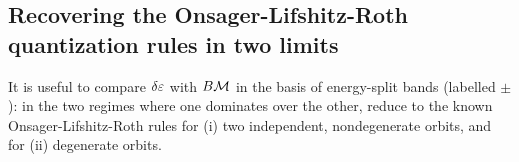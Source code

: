 \documentclass[aps, showpacs, twocolumn, notitlepage, superscriptaddress]{revtex4-1}
\begin{document}





\subsection{Recovering the Onsager-Lifshitz-Roth quantization rules in two limits}\label{sec:recoveronsager}

It is useful to compare $\delta \varepsilon$ with $B{\cal M}$ in the basis of energy-split bands (labelled $\pm$): in the two regimes where one dominates over the other,  reduce to the known Onsager-Lifshitz-Roth rules for (i) two independent, nondegenerate orbits, and for (ii) degenerate orbits.  \\

\end{document}
